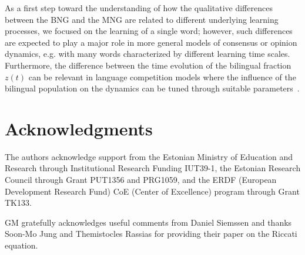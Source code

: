 \documentclass[review]{elsarticle}
\newcommand{\+}{\! + \!}
\begin{document}
As a first step toward the understanding of how the qualitative differences between the BNG and the MNG are related to different underlying learning processes, we focused on the learning of a single word; however, such differences are expected to play a major role in more general models of consensus or opinion dynamics, e.g. with many words characterized by different learning time scales.
Furthermore, the difference between the time evolution of the bilingual fraction $z(t)$ can be relevant in language competition models where the influence of the bilingual population on the dynamics can be tuned through suitable parameters~\cite{Heinsalu-2014a}.





\section*{Acknowledgments}

The authors acknowledge support from the Estonian Ministry of Education and Research through Institutional Research Funding IUT39-1, 
the Estonian Research Council through Grant PUT1356 and PRG1059, 
and the ERDF (European Development Research Fund) CoE (Center of Excellence) program through Grant TK133. 

GM gratefully acknowledges useful comments from Daniel Siemssen and thanks Soon-Mo Jung and Themistocles Rassias for providing their paper on the Riccati equation.




\end{document}
